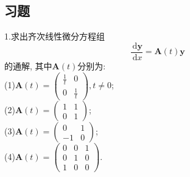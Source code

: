 \documentclass[titlepage,11pt,a4paper,twoside]{report}
\newcommand\diff{\,\mathrm{d}}
\begin{document}
\subsection{习题}
1.求出齐次线性微分方程组\[\frac{\diff\bm{y}}{\diff x}=\bm{A}(t)\bm{y}\]
的通解, 其中$\bm{A}(t)$分别为:\\
(1)$\displaystyle\bm{A}(t)=\begin{pmatrix}\frac{1}{t}&0\\0&\frac{1}{t}\end{pmatrix},t\neq0$;\\
(2)$\displaystyle\bm{A}(t)=\begin{pmatrix}1&1\\0&1\end{pmatrix}$;\\
(3)$\displaystyle\bm{A}(t)=\begin{pmatrix}0&1\\-1&0\end{pmatrix}$;\\
(4)$\displaystyle\bm{A}(t)=\begin{pmatrix}0&0&1\\0&1&0\\1&0&0\end{pmatrix}$.
\end{document}
